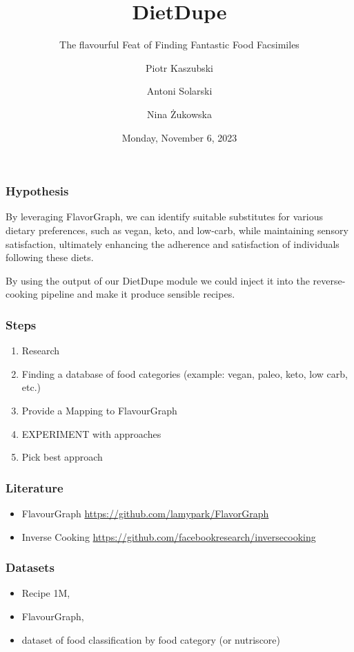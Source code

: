 \documentclass{beamer}
\title{DietDupe}
\subtitle{The flavourful Feat of Finding Fantastic Food Facsimiles}
\author{Piotr Kaszubski \and Antoni Solarski \and Nina Żukowska}
\institute{Poznań University of Technology}
\date{Monday, November  6, 2023}
\begin{document}
\maketitle
\begin{frame}
	\frametitle{Hypothesis}
	By leveraging FlavorGraph, we can identify suitable
	substitutes for various dietary preferences, such as vegan,
	keto, and low-carb, while maintaining sensory satisfaction,
	ultimately enhancing the adherence and satisfaction of
	individuals following these diets.

	\vspace{1cm}
	\noindent
	By using the output of our DietDupe module we could inject it
	into the reverse-cooking pipeline and make it produce
	sensible recipes.
\end{frame}

\begin{frame}
	\frametitle{Steps}
	\begin{enumerate}
		\item Research
		\item Finding a database of food categories (example: vegan, paleo,
			keto, low carb, etc.)
		\item Provide a Mapping to FlavourGraph
		\item EXPERIMENT with approaches
		\item Pick best approach
	\end{enumerate}
\end{frame}

\begin{frame}
	\frametitle{Literature}
	\begin{itemize}
		\item FlavourGraph \url{https://github.com/lamypark/FlavorGraph}
		\item Inverse Cooking \url{https://github.com/facebookresearch/inversecooking}
	\end{itemize}

\end{frame}
\begin{frame}
	\frametitle{Datasets}
	\begin{itemize}
		\item Recipe 1M,
		\item FlavourGraph,
		\item dataset of food classification by food category (or nutriscore)
	\end{itemize}
\end{frame}
\end{document}
